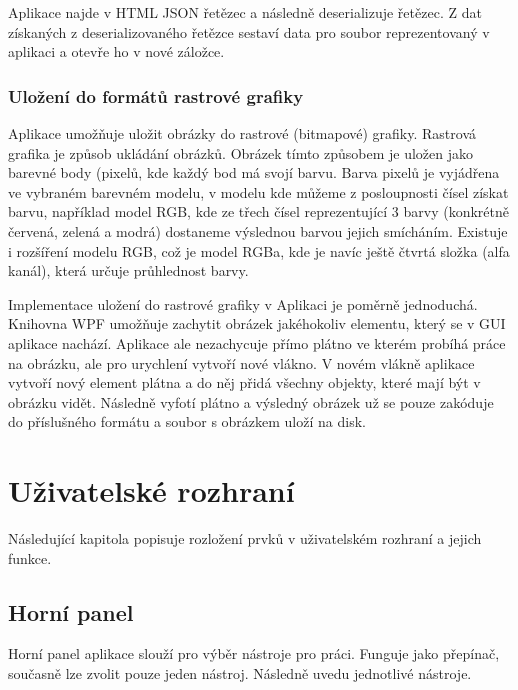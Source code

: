 \documentclass[
  field=inf,
  biblatex,
  glossaries,
  index
]{kidiplom}
\begin{document}
Aplikace najde v HTML JSON řetězec a následně deserializuje řetězec. Z dat získaných z deserializovaného řetězce sestaví data pro soubor reprezentovaný v aplikaci a otevře ho v nové záložce.

\subsubsection{Uložení do formátů rastrové grafiky}
Aplikace umožňuje uložit obrázky do rastrové (bitmapové) grafiky. Rastrová grafika je způsob ukládání obrázků. Obrázek tímto způsobem je uložen jako barevné body (pixelů, kde každý bod má svojí barvu. Barva pixelů je vyjádřena ve vybraném barevném modelu, v modelu kde můžeme z posloupnosti čísel získat barvu, například model RGB, kde ze třech čísel reprezentující 3 barvy (konkrétně červená, zelená a modrá) dostaneme výslednou barvou jejich smícháním. Existuje i rozšíření modelu RGB, což je model RGBa, kde je navíc ještě čtvrtá složka (alfa kanál), která určuje průhlednost barvy.

Implementace uložení do rastrové grafiky v Aplikaci je poměrně jednoduchá. Knihovna WPF umožňuje zachytit obrázek jakéhokoliv elementu, který se v GUI aplikace nachází. Aplikace ale nezachycuje přímo plátno ve kterém probíhá práce na obrázku, ale pro urychlení vytvoří nové vlákno. V novém vlákně aplikace vytvoří nový element plátna a do něj přidá všechny objekty, které mají být v obrázku vidět. Následně vyfotí plátno a výsledný obrázek už se pouze zakóduje do příslušného formátu a soubor s obrázkem uloží na disk.


\section{Uživatelské rozhraní}

Následující kapitola popisuje rozložení prvků v uživatelském rozhraní a jejich funkce.

\subsection{Horní panel}
Horní panel aplikace slouží pro výběr nástroje pro práci. Funguje jako přepínač, současně lze zvolit pouze jeden nástroj. Následně uvedu jednotlivé nástroje.
\end{document}
